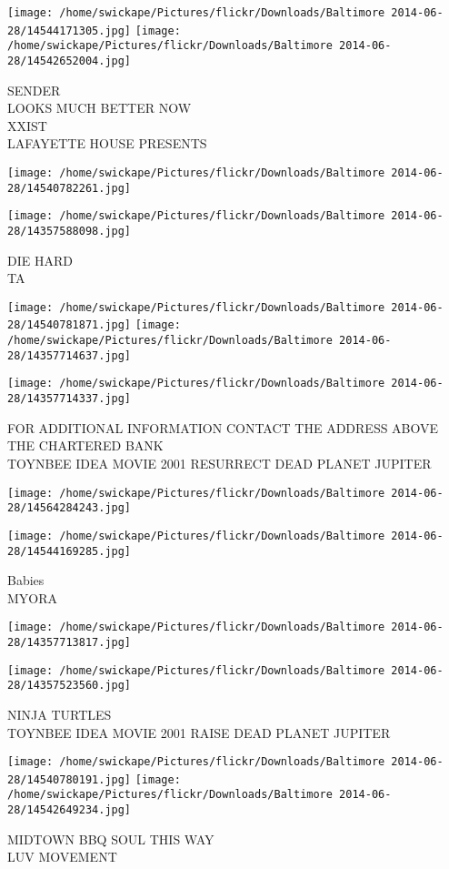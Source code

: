 \documentclass[10pt,letterpaper]{article}
\begin{document}
\texttt{[image: /home/swickape/Pictures/flickr/Downloads/Baltimore 2014-06-28/14544171305.jpg]}
\texttt{[image: /home/swickape/Pictures/flickr/Downloads/Baltimore 2014-06-28/14542652004.jpg]}

SENDER\\
LOOKS MUCH BETTER NOW\\
XXIST\\
LAFAYETTE HOUSE PRESENTS
\pagebreak

\texttt{[image: /home/swickape/Pictures/flickr/Downloads/Baltimore 2014-06-28/14540782261.jpg]}

\vspace{0.25in}
\texttt{[image: /home/swickape/Pictures/flickr/Downloads/Baltimore 2014-06-28/14357588098.jpg]}

DIE HARD\\
TA
\pagebreak

\texttt{[image: /home/swickape/Pictures/flickr/Downloads/Baltimore 2014-06-28/14540781871.jpg]}
\texttt{[image: /home/swickape/Pictures/flickr/Downloads/Baltimore 2014-06-28/14357714637.jpg]}

\vspace{0.25in}
\texttt{[image: /home/swickape/Pictures/flickr/Downloads/Baltimore 2014-06-28/14357714337.jpg]}

FOR ADDITIONAL INFORMATION CONTACT THE ADDRESS ABOVE\\
THE CHARTERED BANK\\
TOYNBEE IDEA MOVIE 2001 RESURRECT DEAD PLANET JUPITER
\pagebreak

\texttt{[image: /home/swickape/Pictures/flickr/Downloads/Baltimore 2014-06-28/14564284243.jpg]}

\vspace{0.25in}
\texttt{[image: /home/swickape/Pictures/flickr/Downloads/Baltimore 2014-06-28/14544169285.jpg]}

Babies\\
MYORA
\pagebreak

\texttt{[image: /home/swickape/Pictures/flickr/Downloads/Baltimore 2014-06-28/14357713817.jpg]}

\vspace{0.25in}
\texttt{[image: /home/swickape/Pictures/flickr/Downloads/Baltimore 2014-06-28/14357523560.jpg]}

NINJA TURTLES\\
TOYNBEE IDEA MOVIE 2001 RAISE DEAD PLANET JUPITER
\pagebreak

\texttt{[image: /home/swickape/Pictures/flickr/Downloads/Baltimore 2014-06-28/14540780191.jpg]}
\texttt{[image: /home/swickape/Pictures/flickr/Downloads/Baltimore 2014-06-28/14542649234.jpg]}

MIDTOWN BBQ SOUL THIS WAY\\
LUV MOVEMENT
\pagebreak
\end{document}
